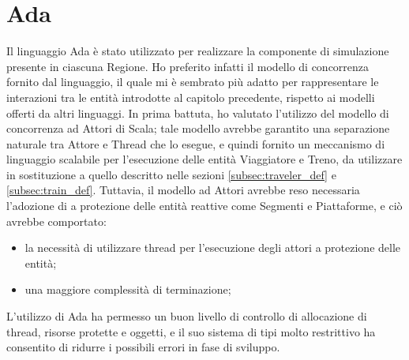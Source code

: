 	\section{Ada}
		Il linguaggio Ada è stato utilizzato per realizzare la componente di simulazione presente in ciascuna Regione. Ho preferito infatti il modello di concorrenza fornito dal linguaggio, il quale mi è sembrato più adatto per rappresentare le interazioni tra le entità introdotte al capitolo precedente, rispetto ai modelli offerti da altri linguaggi. 
		In prima battuta, ho valutato l'utilizzo del modello di concorrenza ad Attori di Scala; tale modello avrebbe garantito una separazione naturale tra Attore e Thread che lo esegue, e quindi fornito un meccanismo di linguaggio scalabile per l'esecuzione delle entità Viaggiatore e Treno, da utilizzare in sostituzione a quello descritto nelle sezioni \ref{subsec:traveler_def} e \ref{subsec:train_def}. Tuttavia, il modello ad Attori avrebbe reso necessaria l'adozione di  a protezione delle entità reattive come Segmenti e Piattaforme, e ciò avrebbe comportato:
			\begin{itemize}
				\item la necessità di utilizzare thread per l'esecuzione degli attori a protezione delle entità;
				\item una maggiore complessità di terminazione;
			\end{itemize}
		L'utilizzo di Ada ha permesso un buon livello di controllo di allocazione di thread, risorse protette e oggetti, e il suo sistema di tipi molto restrittivo ha consentito di ridurre i possibili errori in fase di sviluppo.
	
